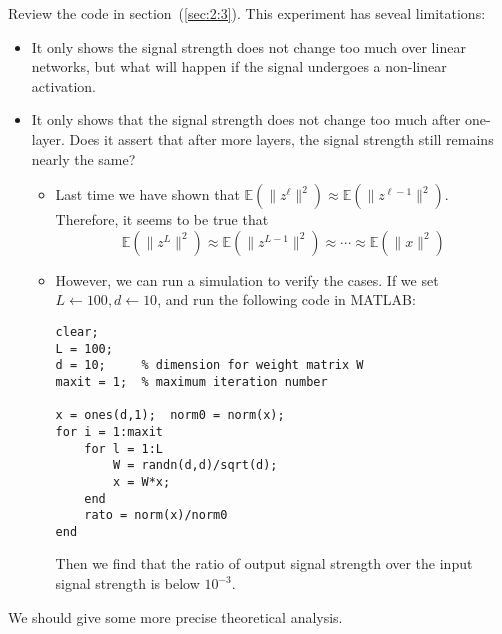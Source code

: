 \begin{example}\label{exp:3:1}
Review the code in section~(\ref{sec:2:3}). This experiment has seveal limitations:
\begin{itemize}
\item
It only shows the signal strength does not change too much over linear networks, but what will happen if the signal undergoes a non-linear activation.
\item
It only shows that the signal strength does not change too much after one-layer. Does it assert that after more layers, the signal strength still remains nearly the same?
\begin{itemize}
\item
Last time we have shown that $\mathbb{E}(\|z^{\ell}\|^2)\approx\mathbb{E}(\|z^{\ell-1}\|^2)$.
Therefore, it seems to be true that 
\[
\mathbb{E}(\|z^L\|^2)\approx
\mathbb{E}(\|z^{L-1}\|^2)\approx
\cdots\approx\mathbb{E}(\|x\|^2)
\]
\item
However, we can run a simulation to verify the cases.
If we set $L\leftarrow100,d\leftarrow10$, and run the following code in MATLAB:
\begin{verbatim}
clear;
L = 100;
d = 10;		% dimension for weight matrix W
maxit = 1;	% maximum iteration number	

x = ones(d,1);  norm0 = norm(x);
for i = 1:maxit
    for l = 1:L
        W = randn(d,d)/sqrt(d);
        x = W*x;
    end
    rato = norm(x)/norm0
end
\end{verbatim}
Then we find that the ratio of output signal strength over the input signal strength is below $10^{-3}$.
\end{itemize}
\end{itemize}
\end{example}
We should give some more precise theoretical analysis.

